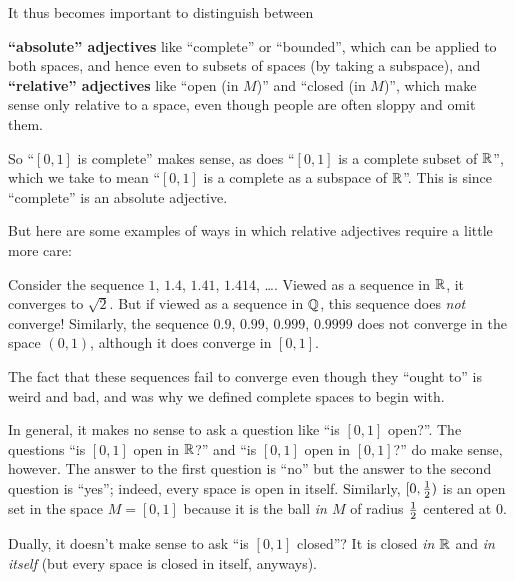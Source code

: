 It thus becomes important to distinguish between
\begin{enumerate}[(i)]
	\ii \textbf{``absolute'' adjectives} like ``complete'' or ``bounded'',
	which can be applied to both spaces,
	and hence even to subsets of spaces (by taking a subspace),
	and
	\ii \textbf{``relative'' adjectives}
	like ``open (in $M$)'' and ``closed (in $M$)'',
	which make sense only relative to a space,
	even though people are often sloppy and omit them.
\end{enumerate}
So ``$[0,1]$ is complete'' makes sense,
as does ``$[0,1]$ is a complete subset of $\mathbb R$'',
which we take to mean ``$[0,1]$ is a complete as a subspace of $\mathbb R$''.
This is since ``complete'' is an absolute adjective.

But here are some examples of ways in which relative adjectives
require a little more care:
\begin{itemize}
	\ii Consider the sequence $1$, $1.4$, $1.41$, $1.414$, \dots.
	Viewed as a sequence in $\mathbb R$, it converges to $\sqrt 2$.
	But if viewed as a sequence in $\mathbb Q$,
	this sequence does \emph{not} converge!
	Similarly, the sequence $0.9$, $0.99$, $0.999$, $0.9999$
	does not converge in the space $(0,1)$,
	although it does converge in $[0,1]$.

	The fact that these sequences fail to converge
	even though they ``ought to'' is weird and bad,
	and was why we defined complete spaces to begin with.

	\ii In general, it makes no sense to ask a question like ``is $[0,1]$ open?''.
	The questions ``is $[0,1]$ open in $\mathbb R$?''
	and ``is $[0,1]$ open in $[0,1]$?'' do make sense, however.
	The answer to the first question is ``no''
	but the answer to the second question is ``yes'';
	indeed, every space is open in itself.
	Similarly, $[0, \frac{1}{2})$ is an open set %
	in the space $M = [0,1]$
	because it is the ball \emph{in $M$}
	of radius $\frac{1}{2}$ centered at $0$.

	\ii Dually, it doesn't make sense to ask ``is $[0,1]$ closed''?
	It is closed \emph{in $\mathbb R$} and \emph{in itself}
	(but every space is closed in itself, anyways).
\end{itemize}


